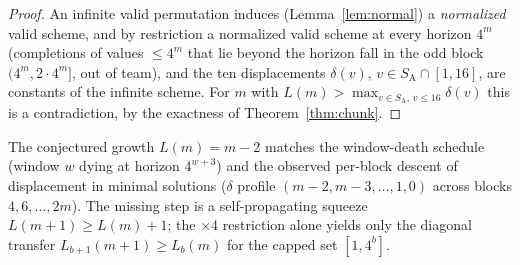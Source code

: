 \documentclass[11pt]{article}
\theoremstyle{definition}
\newcommand{\SA}{S_{\mathrm{A}}}
\begin{document}
\begin{proof}
An
infinite valid permutation induces (Lemma~\ref{lem:normal}) a
\emph{normalized} valid scheme, and by restriction a normalized valid
scheme at every horizon $4^m$ (completions of values $\le 4^m$ that lie
beyond the horizon fall in the odd block $(4^m, 2\cdot 4^m]$, out of
team), and the ten displacements $\delta(v)$, $v \in \SA \cap [1,16]$,
are constants of the infinite
scheme. For $m$ with $L(m) > \max_{v \in \SA,\, v\le 16}\delta(v)$ this is a
contradiction, by the exactness of Theorem~\ref{thm:chunk}.
\end{proof}

The conjectured growth $L(m) = m-2$ matches the window-death schedule
(window $w$ dying at horizon $4^{w+3}$) and the observed per-block descent
of displacement in minimal solutions ($\delta$ profile $(m{-}2, m{-}3,
\dots, 1, 0)$ across blocks $4, 6, \dots, 2m$). The missing step is a
self-propagating squeeze $L(m{+}1) \ge L(m) + 1$; the $\times 4$
restriction alone yields only the diagonal transfer
$L_{b+1}(m{+}1) \ge L_b(m)$ for the capped set $[1, 4^b]$.
\end{document}
